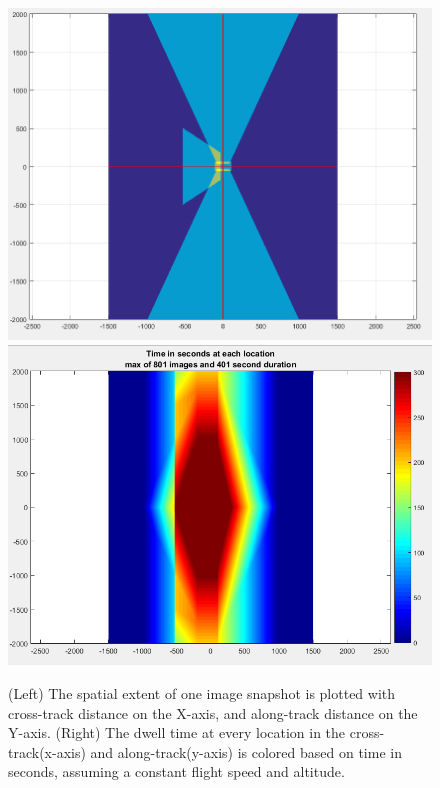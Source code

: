 	\begin{figure}[H]
		\centering
		\includegraphics[scale = 0.3]{../figures/imageoverlap.png}
		\includegraphics[scale = 0.341]{../figures/dwell.PNG}
		\caption{(Left) The spatial extent of one image snapshot is plotted with cross-track distance on the X-axis, and along-track distance on the Y-axis. (Right) The dwell time at every location in the cross-track(x-axis) and along-track(y-axis) is colored based on time in seconds, assuming a constant flight speed and altitude.}
		\label{fig:flightplots}
	\end{figure}
